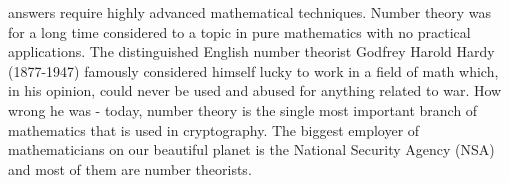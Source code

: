 answers require highly advanced mathematical techniques. Number theory was for a long time considered to a topic in pure mathematics with no practical applications. The distinguished English number theorist Godfrey Harold Hardy (1877-1947) famously considered himself lucky to work in a field of math which, in his opinion, could never be used and abused for anything related to war. How wrong he was - today, number theory is the single most important branch of mathematics that is used in cryptography. The biggest employer of mathematicians on our beautiful planet is the National Security Agency (NSA) and most of them are number theorists.




